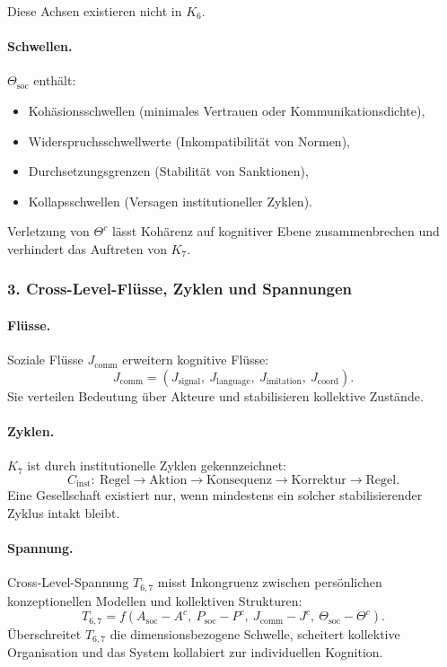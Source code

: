 Diese Achsen existieren nicht in $K_6$.

\paragraph{Schwellen.}
$\Theta_{\mathrm{soc}}$ enthält:
\begin{itemize}
  \item Kohäsionsschwellen (minimales Vertrauen oder Kommunikationsdichte),
  \item Widerspruchsschwellwerte (Inkompatibilität von Normen),
  \item Durchsetzungsgrenzen (Stabilität von Sanktionen),
  \item Kollapsschwellen (Versagen institutioneller Zyklen).
\end{itemize}

Verletzung von $\Theta^{c}$ lässt Kohärenz auf kognitiver Ebene zusammenbrechen
und verhindert das Auftreten von $K_7$.

\subsubsection{3. Cross-Level-Flüsse, Zyklen und Spannungen}

\paragraph{Flüsse.}
Soziale Flüsse $J_{\mathrm{comm}}$ erweitern kognitive Flüsse:
\[
J_{\mathrm{comm}} = (J_{\mathrm{signal}},\ J_{\mathrm{language}},\
                     J_{\mathrm{imitation}},\ J_{\mathrm{coord}}).
\]
Sie verteilen Bedeutung über Akteure und stabilisieren kollektive Zustände.

\paragraph{Zyklen.}
$K_7$ ist durch institutionelle Zyklen gekennzeichnet:
\[
C_{\mathrm{inst}}:\ \text{Regel} \rightarrow \text{Aktion}
\rightarrow \text{Konsequenz} \rightarrow \text{Korrektur}
\rightarrow \text{Regel}.
\]
Eine Gesellschaft existiert nur, wenn mindestens ein solcher stabilisierender
Zyklus intakt bleibt.

\paragraph{Spannung.}
Cross-Level-Spannung $T_{6,7}$ misst Inkongruenz zwischen persönlichen
konzeptionellen Modellen und kollektiven Strukturen:
\[
T_{6,7} = f(A_{\mathrm{soc}} - A^{c},\ P_{\mathrm{soc}} - P^{c},\
          J_{\mathrm{comm}} - J^{c},\ \Theta_{\mathrm{soc}} - \Theta^{c}).
\]
Überschreitet $T_{6,7}$ die dimensionsbezogene Schwelle, scheitert
kollektive Organisation und das System kollabiert zur individuellen Kognition.


